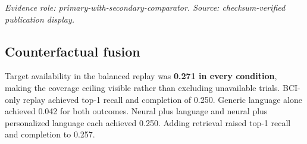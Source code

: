 \documentclass[11pt]{article}
\begin{document}
\begin{table}[H]
\centering
\caption{Paired EEGNet-minus-xDAWN selection contrasts. Secondary model comparison on identical held-out subjects and selection trials. Intervals crossing zero do not establish a selection-ranking difference; the strictly positive Brier contrast indicates worse EEGNet calibration.}
\label{tab:table-3b-p300-paired-contrasts}
\scriptsize
\setlength{\tabcolsep}{3.5pt}
\renewcommand{\arraystretch}{1.15}
\vspace{2pt}
\begin{minipage}{0.98\linewidth}
\footnotesize\textit{Evidence role: primary-with-secondary-comparator. Source: checksum-verified publication display.}
\end{minipage}
\end{table}

\subsection{Counterfactual fusion}

Target availability in the balanced replay was \textbf{0.271 in every condition}, making the coverage ceiling visible rather than excluding unavailable trials. BCI-only replay achieved top-1 recall and completion of 0.250. Generic language alone achieved 0.042 for both outcomes. Neural plus language and neural plus personalized language each achieved 0.250. Adding retrieval raised top-1 recall and completion to 0.257.
\end{document}
